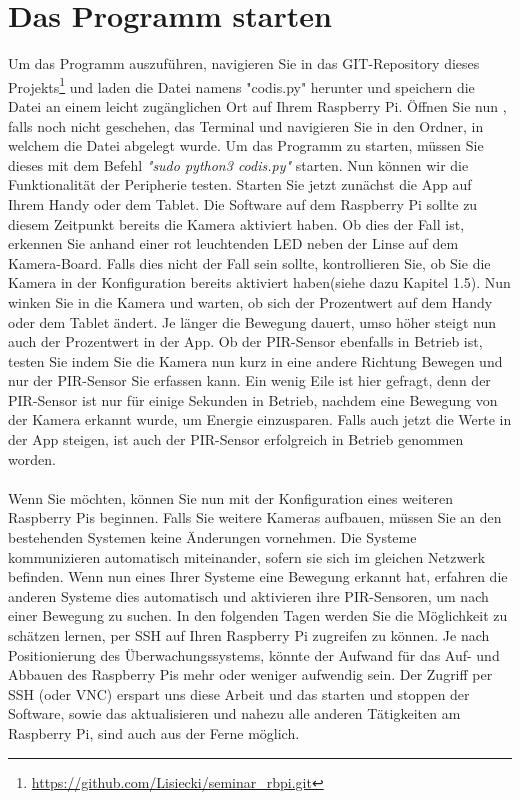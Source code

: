 \documentclass[12pt,a4paper]{scrreprt}
\begin{document}
\section{Das Programm starten}
Um das Programm auszuführen, navigieren Sie in das GIT-Repository dieses Projekts\footnote{\url{https://github.com/Lisiecki/seminar_rbpi.git}} und laden die Datei namens "codis.py" herunter und speichern die Datei an einem leicht zugänglichen Ort auf Ihrem Raspberry Pi. Öffnen Sie nun , falls noch nicht geschehen, das Terminal und navigieren Sie in den Ordner, in welchem die Datei abgelegt wurde. Um das Programm zu starten, müssen Sie dieses mit dem Befehl \textit{"sudo python3 codis.py"} starten. Nun können wir die Funktionalität der Peripherie testen. Starten Sie jetzt zunächst die App auf Ihrem Handy oder dem Tablet. Die Software auf dem Raspberry Pi sollte zu diesem Zeitpunkt bereits die Kamera aktiviert haben. Ob dies der Fall ist, erkennen Sie anhand einer rot leuchtenden LED neben der Linse auf dem Kamera-Board. Falls dies nicht der Fall sein sollte, kontrollieren Sie, ob Sie die Kamera in der Konfiguration bereits aktiviert haben(siehe dazu Kapitel 1.5). Nun winken Sie in die Kamera und warten, ob sich der Prozentwert auf dem Handy oder dem Tablet ändert. Je länger die Bewegung dauert, umso höher steigt nun auch der Prozentwert in der App. Ob der PIR-Sensor ebenfalls in Betrieb ist, testen Sie indem Sie die Kamera nun kurz in eine andere Richtung Bewegen und nur der PIR-Sensor Sie erfassen kann. Ein wenig Eile ist hier gefragt, denn der PIR-Sensor ist nur für einige Sekunden in Betrieb, nachdem eine Bewegung von der Kamera erkannt wurde, um Energie einzusparen. Falls auch jetzt die Werte in der App steigen, ist auch der PIR-Sensor erfolgreich in Betrieb genommen worden.\\ \\Wenn Sie möchten, können Sie nun mit der Konfiguration eines weiteren Raspberry Pis beginnen. Falls Sie weitere Kameras aufbauen, müssen Sie an den bestehenden Systemen keine Änderungen vornehmen. Die Systeme kommunizieren automatisch miteinander, sofern sie sich im gleichen Netzwerk befinden. Wenn nun eines Ihrer Systeme eine Bewegung erkannt hat, erfahren die anderen Systeme dies automatisch und aktivieren ihre PIR-Sensoren, um nach einer Bewegung zu suchen. In den folgenden Tagen werden Sie die Möglichkeit zu schätzen lernen, per SSH auf Ihren Raspberry Pi zugreifen zu können. Je nach Positionierung des Überwachungssystems, könnte der Aufwand für das Auf- und Abbauen des Raspberry Pis mehr oder weniger aufwendig sein. Der Zugriff per SSH (oder VNC) erspart uns diese Arbeit und das starten und stoppen der Software, sowie das aktualisieren und nahezu alle anderen Tätigkeiten am Raspberry Pi, sind auch aus der Ferne möglich.
\end{document}
